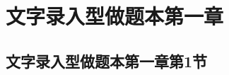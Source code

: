 \documentclass[standard, analysis]{ExBook}
\begin{document}


\maketitle 
 
 



\setcounter{page}{1}
\tableofcontents 
    
\clearpage 

\section{文字录入型做题本第一章}
\subsection{文字录入型做题本第一章第1节}
\end{document}
